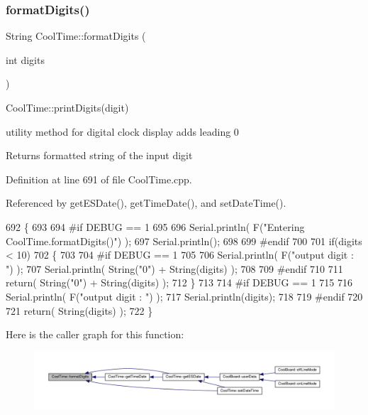 \subsubsection{\texorpdfstring{format\+Digits()}{formatDigits()}}
{\footnotesize\ttfamily String Cool\+Time\+::format\+Digits (\begin{DoxyParamCaption}\item[{int}]{digits }\end{DoxyParamCaption})}

Cool\+Time\+::print\+Digits(digit)

utility method for digital clock display adds leading 0

\begin{DoxyReturn}{Returns}
formatted string of the input digit 
\end{DoxyReturn}


Definition at line 691 of file Cool\+Time.\+cpp.



Referenced by get\+E\+S\+Date(), get\+Time\+Date(), and set\+Date\+Time().


\begin{DoxyCode}
692 \{
693 
694 \textcolor{preprocessor}{#if DEBUG == 1 }
695 
696     Serial.println( F(\textcolor{stringliteral}{"Entering CoolTime.formatDigits()"}) );
697     Serial.println();
698 
699 \textcolor{preprocessor}{#endif }
700 
701     \textcolor{keywordflow}{if}(digits < 10)
702     \{
703     
704 \textcolor{preprocessor}{    #if DEBUG == 1}
705 
706         Serial.println( F(\textcolor{stringliteral}{"output digit : "}) );
707         Serial.println( String(\textcolor{stringliteral}{"0"}) + String(digits) );
708 
709 \textcolor{preprocessor}{    #endif}
710 
711         \textcolor{keywordflow}{return}( String(\textcolor{stringliteral}{"0"}) + String(digits) );
712     \}
713     
714 \textcolor{preprocessor}{#if DEBUG == 1 }
715 
716     Serial.println( F(\textcolor{stringliteral}{"output digit : "}) );
717     Serial.println(digits);
718 
719 \textcolor{preprocessor}{#endif}
720 
721     \textcolor{keywordflow}{return}( String(digits) );
722 \}
\end{DoxyCode}
Here is the caller graph for this function\+:
\nopagebreak
\begin{figure}[H]
\begin{center}
\leavevmode
\includegraphics[width=350pt]{classCoolTime_acd537cd4210d7bde4e1f5c47d2ac0456_icgraph}
\end{center}
\end{figure}
\mbox{\label{classCoolTime_ac4f32ee513c1328d984306645e8785a4}} 
